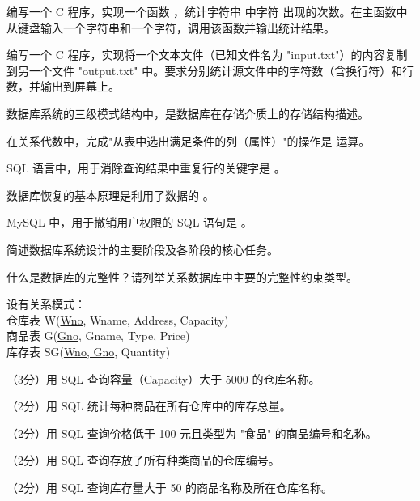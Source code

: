 \documentclass[a4paper,11pt]{article}
\begin{document}

\pq 编写一个 C 程序，实现一个函数 ，统计字符串  中字符  出现的次数。在主函数中从键盘输入一个字符串和一个字符，调用该函数并输出统计结果。
\anslines{5cm}

\pq 编写一个 C 程序，实现将一个文本文件（已知文件名为 "input.txt"）的内容复制到另一个文件 "output.txt" 中。要求分别统计源文件中的字符数（含换行符）和行数，并输出到屏幕上。
\anslines{6cm}



\q 数据库系统的三级模式结构中，\fillblank 是数据库在存储介质上的存储结构描述。

\q 在关系代数中，完成"从表中选出满足条件的列（属性）"的操作是 \fillblank 运算。

\q SQL 语言中，用于消除查询结果中重复行的关键字是 \fillblank 。

\q 数据库恢复的基本原理是利用了数据的 \fillblank 。

\q MySQL 中，用于撤销用户权限的 SQL 语句是 \fillblank 。


\q 简述数据库系统设计的主要阶段及各阶段的核心任务。
\anslines{3cm}

\q 什么是数据库的完整性？请列举关系数据库中主要的完整性约束类型。
\anslines{3cm}


设有关系模式：\\
仓库表 W(\underline{Wno}, Wname, Address, Capacity)\\
商品表 G(\underline{Gno}, Gname, Type, Price)\\
库存表 SG(\underline{Wno, Gno}, Quantity)

\q （3分）用 SQL 查询容量（Capacity）大于 5000 的仓库名称。
\anslines{0.8cm}

\q （2分）用 SQL 统计每种商品在所有仓库中的库存总量。
\anslines{0.8cm}

\q （2分）用 SQL 查询价格低于 100 元且类型为 "食品" 的商品编号和名称。
\anslines{0.8cm}

\q （2分）用 SQL 查询存放了所有种类商品的仓库编号。
\anslines{1cm}

\q （2分）用 SQL 查询库存量大于 50 的商品名称及所在仓库名称。
\anslines{0.8cm}
\end{document}

